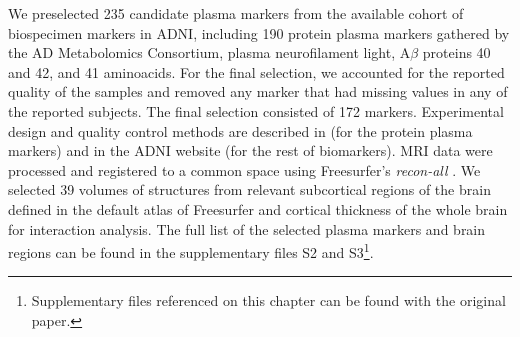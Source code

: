 \begin{table}[!htbp]
\centering
{}
\caption[Demographic information of the studied cohort.]{Demographic information of the studied cohort. Categorical variables are expressed as counts and percentages. Continuous variables are expressed as mean $\pm$ standard deviation. CN: Cognitive normal. MCI: Mild cognitive impairment. AD: Alzheimer's disease. ApoE4: Apolipoprotein E4.  MMSE: mini-mental state examination.}
\label{tab:data}
\end{table}

We preselected 235 candidate plasma markers from the available cohort of biospecimen markers in ADNI, including 190 protein plasma markers gathered by the AD Metabolomics Consortium, plasma neurofilament light, A$\beta$ proteins 40 and 42, and 41 aminoacids. For the final selection, we accounted for the reported quality of the samples and removed any marker that had missing values in any of the reported subjects. The final selection consisted of 172 markers. Experimental design and quality control methods are described in \cite{DataPrimer} (for the protein plasma markers) and in the ADNI website (for the rest of biomarkers). MRI data were processed and registered to a common space using Freesurfer's \textit{recon-all} \cite{Fischl2012}. We selected 39 volumes of structures from relevant subcortical regions of the brain defined in the default atlas of Freesurfer \cite{Fischl2002} and cortical thickness of the whole brain for interaction analysis. The full list of the selected plasma markers and brain regions can be found in the supplementary files S2 and S3\footnote{Supplementary files referenced on this chapter can be found with the original paper.}. \\

